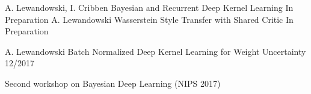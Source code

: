\begin{cventries}
    \cventry
    {A. Lewandowski, I. Cribben}
    {Bayesian and Recurrent Deep Kernel Learning}
    {In Preparation}
    {
    }
      \cventry
    {A. Lewandowski}
    {Wasserstein Style Transfer with Shared Critic}
    {In Preparation}
    {
    }

  \cventry
    {A. Lewandowski}
    {Batch Normalized Deep Kernel Learning for Weight
Uncertainty}
    {12/2017}
    {
      \begin{cvitems}
    	\item Second workshop on Bayesian Deep Learning (NIPS 2017)
      \end{cvitems}
    }
  \end{cventries}

% 
% 
